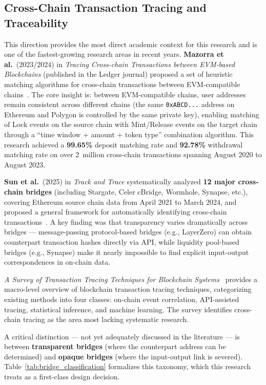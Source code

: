\documentclass[12pt,a4paper]{article}
\begin{document}
\subsection{Cross-Chain Transaction Tracing and Traceability}

This direction provides the most direct academic context for this research and is one of the fastest-growing research areas in recent years. \textbf{Mazorra et al.}~(2023/2024) in \textit{Tracing Cross-chain Transactions between EVM-based Blockchains} (published in the Ledger journal) proposed a set of heuristic matching algorithms for cross-chain transactions between EVM-compatible chains~\cite{mazorra2023}. The core insight is: between EVM-compatible chains, user addresses remain consistent across different chains (the same \texttt{0xABCD...} address on Ethereum and Polygon is controlled by the same private key), enabling matching of Lock events on the source chain with Mint/Release events on the target chain through a ``time window + amount + token type'' combination algorithm. This research achieved a \textbf{99.65\%} deposit matching rate and \textbf{92.78\%} withdrawal matching rate on over 2~million cross-chain transactions spanning August 2020 to August 2023.

\textbf{Sun et al.}~(2025) in \textit{Track and Trace} systematically analyzed \textbf{12 major cross-chain bridges} (including Stargate, Celer cBridge, Wormhole, Synapse, etc.), covering Ethereum source chain data from April 2021 to March 2024, and proposed a general framework for automatically identifying cross-chain transactions~\cite{sun2025track}. A key finding was that transparency varies dramatically across bridges --- message-passing protocol-based bridges (e.g., LayerZero) can obtain counterpart transaction hashes directly via API, while liquidity pool-based bridges (e.g., Synapse) make it nearly impossible to find explicit input-output correspondences in on-chain data.

\textit{A Survey of Transaction Tracing Techniques for Blockchain Systems}~\cite{ren2025survey} provides a macro-level overview of blockchain transaction tracing techniques, categorizing existing methods into four classes: on-chain event correlation, API-assisted tracing, statistical inference, and machine learning. The survey identifies cross-chain tracing as the area most lacking systematic research.

A critical distinction --- not yet adequately discussed in the literature --- is between \textbf{transparent bridges} (where the counterpart address can be determined) and \textbf{opaque bridges} (where the input-output link is severed). Table~\ref{tab:bridge_classification} formalizes this taxonomy, which this research treats as a first-class design decision.
\end{document}
